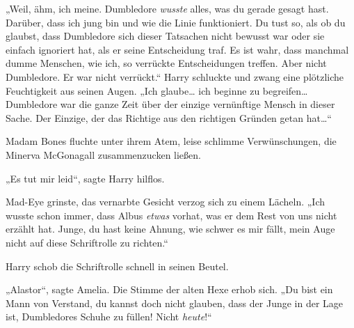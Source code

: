 „Weil, ähm, ich meine. Dumbledore \emph{wusste} alles, was du gerade gesagt hast. Darüber, dass ich jung bin und wie die Linie funktioniert. Du tust so, als ob du glaubst, dass Dumbledore sich dieser Tatsachen nicht bewusst war oder sie einfach ignoriert hat, als er seine Entscheidung traf. Es ist wahr, dass manchmal dumme Menschen, wie ich, so verrückte Entscheidungen treffen. Aber nicht Dumbledore. Er war nicht verrückt.“
Harry schluckte und zwang eine plötzliche Feuchtigkeit aus seinen Augen.
„Ich glaube… ich beginne zu begreifen… Dumbledore war die ganze Zeit über der einzige vernünftige Mensch in dieser Sache. Der Einzige, der das Richtige aus den richtigen Gründen getan hat…“

Madam Bones fluchte unter ihrem Atem, leise schlimme Verwünschungen, die Minerva McGonagall zusammenzucken ließen.

„Es tut mir leid“, sagte Harry hilflos.

Mad-Eye grinste, das vernarbte Gesicht verzog sich zu einem Lächeln.
„Ich wusste schon immer, dass Albus \emph{etwas} vorhat, was er dem Rest von uns nicht erzählt hat. Junge, du hast keine Ahnung, wie schwer es mir fällt, mein Auge nicht auf diese Schriftrolle zu richten.“

Harry schob die Schriftrolle schnell in seinen Beutel.

„Alastor“, sagte Amelia. Die Stimme der alten Hexe erhob sich. „Du bist ein Mann von Verstand, du kannst doch nicht glauben, dass der Junge in der Lage ist, Dumbledores Schuhe zu füllen! Nicht \emph{heute}!“

